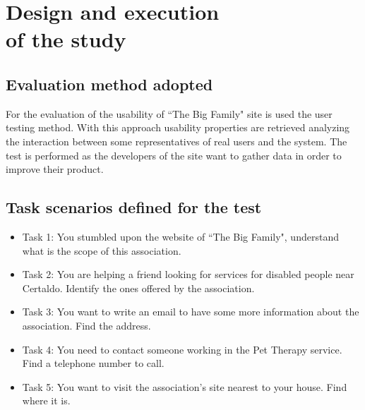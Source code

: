 %
%
\chapter{Design and execution\\of the study}
%
%
%
\section{Evaluation method adopted}
For the evaluation of the usability of ``The Big Family" site is used the user testing method. With this approach usability properties are retrieved analyzing the interaction between some representatives of real users and the system. The test is performed as the developers of the site want to gather data in order to improve their product.
%
%
\section{Task scenarios defined for the test}
\begin{itemize}
\item Task 1: You stumbled upon the website of ``The Big Family", understand what is the scope of this association.
\item Task 2: You are helping a friend looking for services for disabled people near Certaldo. Identify the ones offered by the association.
\item Task 3: You want to write an email to have some more information about the association. Find the address.
\item Task 4: You need to contact someone working in the Pet Therapy service. Find a telephone number to call.
\item Task 5: You want to visit the association's site nearest to your house. Find where it is.
\end{itemize}
%
%
